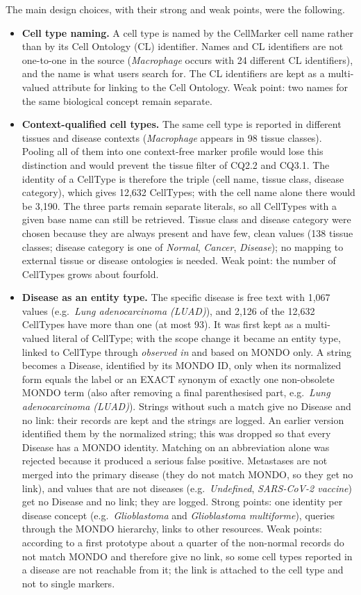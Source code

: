 \noindent The main design choices, with their strong and weak points, were the following.
\begin{itemize}
    \item \textbf{Cell type naming.} A cell type is named by the CellMarker cell name rather than by its Cell Ontology (CL) identifier. Names and CL identifiers are not one-to-one in the source (\emph{Macrophage} occurs with 24 different CL identifiers), and the name is what users search for. The CL identifiers are kept as a multi-valued attribute for linking to the Cell Ontology. Weak point: two names for the same biological concept remain separate.
    \item \textbf{Context-qualified cell types.} The same cell type is reported in different tissues and disease contexts (\emph{Macrophage} appears in 98 tissue classes). Pooling all of them into one context-free marker profile would lose this distinction and would prevent the tissue filter of CQ2.2 and CQ3.1. The identity of a CellType is therefore the triple (cell name, tissue class, disease category), which gives 12,632 CellTypes; with the cell name alone there would be 3,190. The three parts remain separate literals, so all CellTypes with a given base name can still be retrieved. Tissue class and disease category were chosen because they are always present and have few, clean values (138 tissue classes; disease category is one of \emph{Normal}, \emph{Cancer}, \emph{Disease}); no mapping to external tissue or disease ontologies is needed. Weak point: the number of CellTypes grows about fourfold.
    \item \textbf{Disease as an entity type.} The specific disease is free text with 1,067 values (e.g.\ \emph{Lung adenocarcinoma (LUAD)}), and 2,126 of the 12,632 CellTypes have more than one (at most 93). It was first kept as a multi-valued literal of CellType; with the scope change it became an entity type, linked to CellType through \emph{observed in} and based on MONDO only. A string becomes a Disease, identified by its MONDO ID, only when its normalized form equals the label or an EXACT synonym of exactly one non-obsolete MONDO term (also after removing a final parenthesised part, e.g.\ \emph{Lung adenocarcinoma (LUAD)}). Strings without such a match give no Disease and no link: their records are kept and the strings are logged. An earlier version identified them by the normalized string; this was dropped so that every Disease has a MONDO identity. Matching on an abbreviation alone was rejected because it produced a serious false positive. Metastases are not merged into the primary disease (they do not match MONDO, so they get no link), and values that are not diseases (e.g.\ \emph{Undefined}, \emph{SARS-CoV-2 vaccine}) get no Disease and no link; they are logged. Strong points: one identity per disease concept (e.g.\ \emph{Glioblastoma} and \emph{Glioblastoma multiforme}), queries through the MONDO hierarchy, links to other resources. Weak points: according to a first prototype about a quarter of the non-normal records do not match MONDO and therefore give no link, so some cell types reported in a disease are not reachable from it; the link is attached to the cell type and not to single markers.

\end{itemize}

